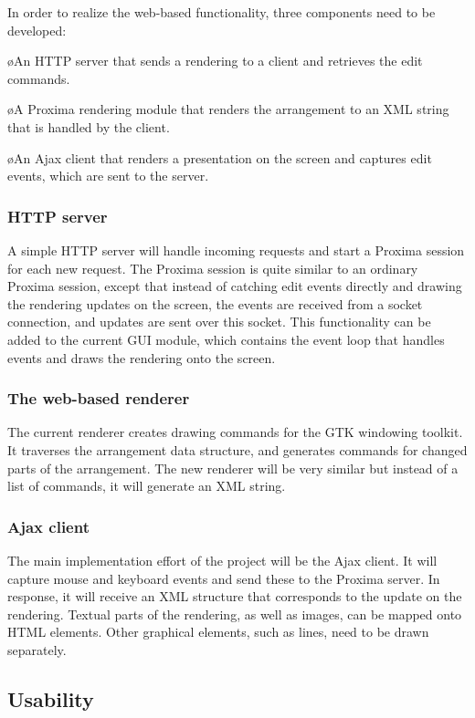 \documentclass[10pt]{article}
\begin{document}
In order to realize the web-based functionality, three components need to be developed:

\bl
\o An HTTP server that sends a rendering to a client and retrieves the edit commands. 

\o A Proxima rendering module that renders the arrangement to an XML string that is handled by the client.

\o An Ajax client that renders a presentation on the screen and captures edit events, which are sent to the server.
\el

\subsubsection{HTTP server}

A simple HTTP server will handle incoming requests and start a Proxima session for each new request. The Proxima session is quite similar to an ordinary Proxima session, except that instead of catching edit events directly and drawing the rendering updates on the screen, the events are received from a socket connection, and updates are sent over  this socket. This functionality can be added to the current GUI module, which contains the event loop that handles events and draws the rendering onto the screen. 
 
\subsubsection{The web-based renderer}

The current renderer creates drawing commands for the GTK windowing toolkit. It traverses the arrangement data structure, and generates commands for changed parts of the arrangement. The new renderer will be very similar but instead of a list of commands, it will generate an XML string.

\subsubsection{Ajax client}

The main implementation effort of the project will be the Ajax client. It will capture mouse and keyboard events and send these to the Proxima server. In response, it will receive an XML structure that corresponds to the update on the rendering. Textual parts of the rendering, as well as images, can be mapped onto HTML elements. Other graphical elements, such as lines, need to be drawn separately.

\subsection{Usability}
\end{document}
